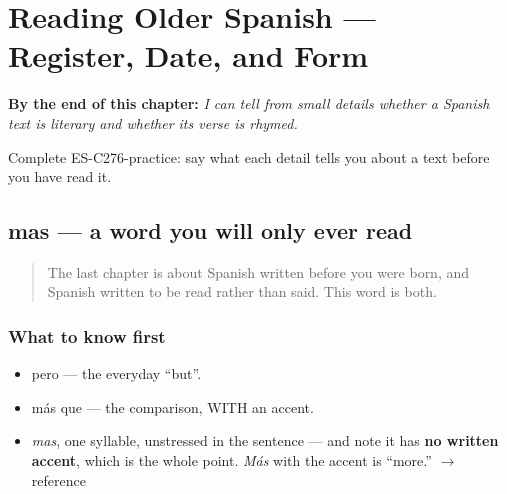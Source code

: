 
\chapter{Reading Older Spanish --- Register, Date, and Form}
\label{ch:literario}

\begin{chapteropening}
\textbf{By the end of this chapter:} \emph{I can tell from small details whether a Spanish text is literary and whether its verse is rhymed.}

Complete ES-C276-practice: say what each detail tells you about a text before you have read it.
\end{chapteropening}

\section[mas]{mas — a word you will only ever read}

\label{lesson:ES-C276-mas}



\begin{quote}
The last chapter is about Spanish written before you were born, and Spanish written to be read rather than said. This word is both.
\end{quote}

\subsection*{What to know first}
\begin{itemize}
\raggedright
  \item pero — the everyday \textquotedblleft{}but\textquotedblright{}.
  \item más que — the comparison, WITH an accent.
\end{itemize}

\begin{sounds}
\begin{itemize}
\raggedright
  \item \emph{mas}, one syllable, unstressed in the sentence — and note it has \textbf{no written accent}, which is the whole point. \emph{Más} with the accent is \textquotedblleft{}more.\textquotedblright{} $\to$ reference
\end{itemize}
\end{sounds}

